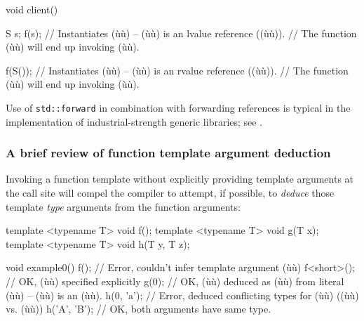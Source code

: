 \begin{emcppslisting}[emcppsbatch=e2]
void client()
{
    S s;
    f(s);    // Instantiates (ù{}ù) -- (ù{}ù) is an lvalue reference ((ù{}ù)).
             // The function (ù{}ù) will end up invoking (ù{}ù).

    f(S());  // Instantiates (ù{}ù) -- (ù{}ù) is an rvalue reference ((ù{}ù)).
             // The function (ù{}ù) will end up invoking (ù{}ù).
}
\end{emcppslisting}

\noindent Use of \lstinline!std::forward! in combination with forwarding references
is typical in the implementation of industrial-strength generic
libraries; see .

\subsubsection[A brief review of function template argument deduction]{A brief review of function template argument deduction}\label{a-brief-review-of-function-template-argument-deduction}

Invoking a function template without explicitly providing template
arguments at the call site will compel the compiler to attempt, if
possible, to \emph{deduce} those template \emph{type} arguments from the
function arguments:

\begin{emcppslisting}
template <typename T> void f();
template <typename T> void g(T x);
template <typename T> void h(T y, T z);

void example0()
{
    f();        // Error, couldn't infer template argument (ù{}ù)
    f<short>(); // OK, (ù{}ù) specified explicitly
    g(0);       // OK, (ù{}ù) deduced as (ù{}ù) from literal (ù{}ù) -- (ù{}ù) is an (ù{}ù).
    h(0, 'a');  // Error, deduced conflicting types for (ù{}ù) ((ù{}ù) vs. (ù{}ù))
    h('A', 'B'); // OK, both arguments have same type.
}
\end{emcppslisting}

